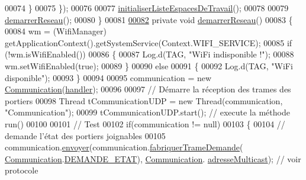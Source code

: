 \begin{DoxyCode}
00074             \}
00075         \});
00076 
00077         \hyperlink{classcom_1_1lasalle_1_1meeting_1_1_i_h_m_meeting_a6624feade3dc156bc7eb40f79cb47267}{initialiserListeEspacesDeTravail}();
00078 
00079         \hyperlink{classcom_1_1lasalle_1_1meeting_1_1_i_h_m_meeting_ab9ef4bd3436aa480f92a5b1922fd6666}{demarrerReseau}();
00080     \}
00081 
\hyperlink{classcom_1_1lasalle_1_1meeting_1_1_i_h_m_meeting_ab9ef4bd3436aa480f92a5b1922fd6666}{00082}     \textcolor{keyword}{private} \textcolor{keywordtype}{void} \hyperlink{classcom_1_1lasalle_1_1meeting_1_1_i_h_m_meeting_ab9ef4bd3436aa480f92a5b1922fd6666}{demarrerReseau}()
00083     \{
00084         wm = (WifiManager) getApplicationContext().getSystemService(Context.WIFI\_SERVICE);
00085         \textcolor{keywordflow}{if} (!wm.isWifiEnabled())
00086         \{
00087             Log.d(TAG, \textcolor{stringliteral}{"WiFi indisponible !"});
00088             wm.setWifiEnabled(\textcolor{keyword}{true});
00089         \}
00090         \textcolor{keywordflow}{else}
00091         \{
00092             Log.d(TAG, \textcolor{stringliteral}{"WiFi disponible"});
00093         \}
00094 
00095         communication = \textcolor{keyword}{new} \hyperlink{classcom_1_1lasalle_1_1meeting_1_1_communication}{Communication}(\hyperlink{classcom_1_1lasalle_1_1meeting_1_1_i_h_m_meeting_af0a341dd3f520bba9d94b4b083ff75af}{handler});
00096 
00097         \textcolor{comment}{// Démarre la réception des trames des portiers}
00098         Thread tCommunicationUDP = \textcolor{keyword}{new} Thread(communication, \textcolor{stringliteral}{"Communication"});
00099         tCommunicationUDP.start(); \textcolor{comment}{// execute la méthode run()}
00100 
00101         \textcolor{comment}{// Test}
00102         \textcolor{keywordflow}{if}(communication != null)
00103         \{
00104             \textcolor{comment}{// demande l'état des portiers joignables}
00105             communication.\hyperlink{classcom_1_1lasalle_1_1meeting_1_1_communication_a03f0e419513d7f33900dde412e2a4471}{envoyer}(communication.\hyperlink{classcom_1_1lasalle_1_1meeting_1_1_communication_a3b07023cb3f3a1549da711b5c6ba6af1}{fabriquerTrameDemande}(
      \hyperlink{classcom_1_1lasalle_1_1meeting_1_1_communication}{Communication}.\hyperlink{classcom_1_1lasalle_1_1meeting_1_1_communication_acb13915d9514b99c3b9bc99358e42db6}{DEMANDE\_ETAT}), \hyperlink{classcom_1_1lasalle_1_1meeting_1_1_communication}{Communication}.
      \hyperlink{classcom_1_1lasalle_1_1meeting_1_1_communication_a6a2d2e62f87bef261a1999eb5acf8abb}{adresseMulticast}); \textcolor{comment}{// voir protocole}

\end{DoxyCode}
